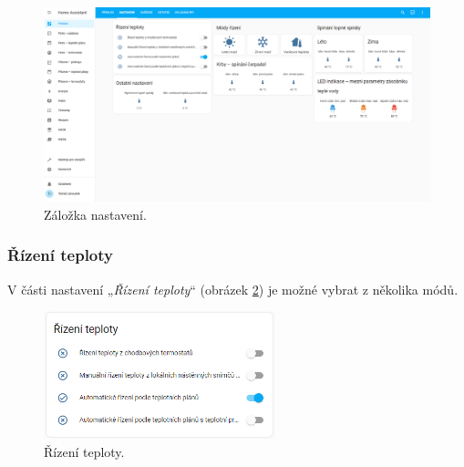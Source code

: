 \begin{Czech}
\begin{figure}[H]
    \centering
    \includegraphics[width=1\textwidth]{pictures/czech/software/tab-settings.png}
    \caption{Záložka nastavení.}
    \label{fig:tab-settings}
\end{figure}
\end{Czech}


\begin{Czech}
\subsubsection{Řízení teploty}
\end{Czech}
\label{sec:temperature-control}

\begin{Czech}
V části nastavení „\textit{Řízení teploty}“ (obrázek \ref{fig:temperature-control}) je možné vybrat z  několika módů. 
\end{Czech}

\begin{Czech}
\begin{figure}[H]
    \centering
    \includegraphics[width=0.6\textwidth]{pictures/czech/software/temperature-control.png}
    \caption{Řízení teploty.}
    \label{fig:temperature-control}
\end{figure}
\end{Czech}

